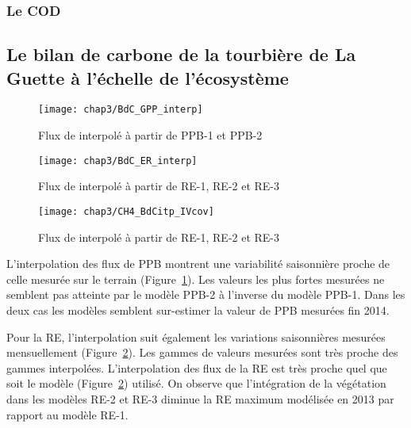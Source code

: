 \subsubsection{Le COD}


\subsection{Le bilan de carbone de la tourbière de La Guette à l'échelle de l'écosystème}


\begin{figure}
\centering
\texttt{[image: chap3/BdC\_GPP\_interp]}
\caption{Flux de \coo interpolé à partir de PPB-1 et PPB-2}
\label{fig:BdC_GPP_interp}
\end{figure}

\begin{figure}
\centering
\texttt{[image: chap3/BdC\_ER\_interp]}
\caption{Flux de \coo interpolé à partir de RE-1, RE-2 et RE-3}
\label{fig:BdC_ER_interp}
\end{figure}

\begin{figure}
\centering
\texttt{[image: chap3/CH4\_BdCitp\_IVcov]}
\caption{Flux de \coo interpolé à partir de RE-1, RE-2 et RE-3}
\label{fig:BdC_CH4_interp}
\end{figure}



L'interpolation des flux de PPB montrent une variabilité saisonnière proche de celle mesurée sur le terrain (Figure~\ref{fig:BdC_GPP_interp}). 
Les valeurs les plus fortes mesurées ne semblent pas atteinte par le modèle PPB-2 à l'inverse du modèle PPB-1.
Dans les deux cas les modèles semblent sur-estimer la valeur de PPB mesurées fin 2014.

Pour la RE, l'interpolation suit également les variations saisonnières mesurées mensuellement (Figure~\ref{fig:BdC_ER_interp}).
Les gammes de valeurs mesurées sont très proche des gammes interpolées.
L'interpolation des flux de la RE est très proche quel que soit le modèle (Figure~\ref{fig:BdC_ER_interp}) utilisé.
On observe que l'intégration de la végétation dans les modèles RE-2 et RE-3 diminue la RE maximum modélisée en 2013 par rapport au modèle RE-1.

